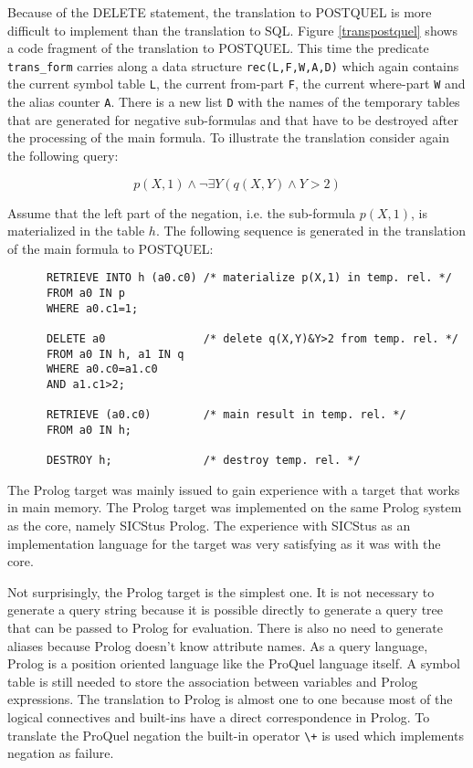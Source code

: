 Because of the DELETE statement, the translation to POSTQUEL is more difficult to implement
than the translation to SQL. Figure \ref{transpostquel} shows a code fragment of the translation
to POSTQUEL. This time the predicate \verb.trans_form. carries along a data structure
\verb.rec(L,F,W,A,D). which again contains the current symbol table \verb.L., the current 
from-part \verb.F., the current where-part \verb.W. and the alias counter \verb.A.. There is 
a new list \verb.D. with the names of the temporary tables that are generated for negative 
sub-formulas and that have to be destroyed after the processing of the main formula. 
To illustrate the translation consider again the following query:

\begin{displaymath}
p(X,1) \wedge \neg \exists Y(q(X,Y) \wedge Y>2)
\end{displaymath}

Assume that the left part of the negation, i.e. the sub-formula $p(X,1)$, is materialized
in the table $h$. The following sequence is generated in the translation of the main
formula to POSTQUEL:

\begin{verbatim}
      RETRIEVE INTO h (a0.c0) /* materialize p(X,1) in temp. rel. */
      FROM a0 IN p
      WHERE a0.c1=1;

      DELETE a0               /* delete q(X,Y)&Y>2 from temp. rel. */
      FROM a0 IN h, a1 IN q
      WHERE a0.c0=a1.c0
      AND a1.c1>2;

      RETRIEVE (a0.c0)        /* main result in temp. rel. */
      FROM a0 IN h;

      DESTROY h;              /* destroy temp. rel. */
\end{verbatim}

\label{secincore}
The Prolog target was mainly issued to gain experience with a target that works in main memory. 
The Prolog target was implemented on the same Prolog system as the core, namely SICStus Prolog. 
The experience with SICStus as an implementation language for the target was very satisfying as
it was with the core. 

Not surprisingly, the Prolog target is the simplest one. It is not necessary to generate a query 
string because it is possible directly to generate a query tree that can be passed to Prolog for 
evaluation. There is also no need to generate aliases because Prolog doesn't know attribute names.
As a query language, Prolog is a position oriented language like the ProQuel language itself. A 
symbol table is still needed to store the association between variables and Prolog expressions.
The translation to Prolog is almost one to one because most of the logical connectives and
built-ins have a direct correspondence in Prolog. To translate the ProQuel negation the built-in
operator \verb.\+. is used which implements negation as failure.


